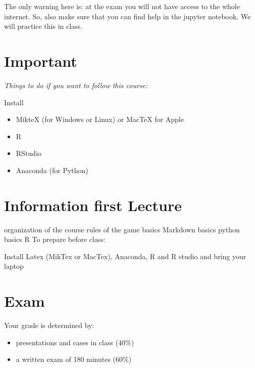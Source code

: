 \documentclass[]{book}
\providecommand{\tightlist}{%
  \setlength{\itemsep}{0pt}\setlength{\parskip}{0pt}}
\begin{document}
The only warning here is: at the exam you will not have access to the
whole internet. So, also make sure that you can find help in the jupyter
notebook. We will practice this in class.

\chapter{Important}\label{important}

\emph{Things to do if you want to follow this course:}

Install

\begin{itemize}
\tightlist
\item
  MikteX (for Windows or Linux) or MacTeX for Apple
\item
  R
\item
  RStudio
\item
  Anaconda (for Python)
\end{itemize}

\chapter{Information first Lecture}\label{information-first-lecture}

organization of the course rules of the game basics Markdown basics
python basics R To prepare before class:

Install Latex (MikTex or MacTex), Anaconda, R and R studio and bring
your laptop

\chapter{Exam}\label{exam}

Your grade is determined by:

\begin{itemize}
\tightlist
\item
  presentations and cases in class (40\%)
\item
  a written exam of 180 minutes (60\%)
\end{itemize}


\end{document}
